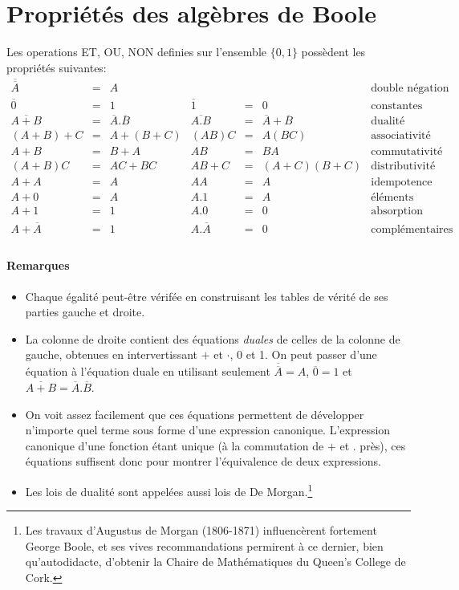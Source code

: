 \section{Propri\'et\'es des alg\`ebres de Boole}

Les operations ET, OU, NON definies sur l'ensemble $\{0,1\}$ poss\`edent les 
propri\'et\'es suivantes:
{\small
$$\begin{array}{rclrcll}
 \overline{\overline{A}} &=& A& &&	& \mbox{double n\'egation} \\
\overline{0} &=& 1	& \overline{1}	&=& 0	& \mbox{constantes} \\
\overline{A+B} &=& \overline{A}.\overline{B}	&
\overline{A.B}	&=& \overline{A}+\overline{B}	& 
\mbox{dualit\'e} \\
(A+B)+C &=& A+(B+C)	&
(AB)C	&=& A(BC)	& \mbox{associativit\'e} \\
A+B &=&	B+A & AB	&=& BA	& \mbox{commutativit\'e} \\
(A+B)C &=& AC+BC &
AB+C	&=& (A+C)(B+C)	& \mbox{distributivit\'e} \\
A+A &=&	A & AA	&=& A	& \mbox{idempotence} \\
A+0 &=&	A & A.1 &=& A	& \mbox{\'el\'ements neutres} \\
A+1 &=&	1 & A.0 &=& 0	& \mbox{absorption} \\
A+\overline{A} &=&	1 & A.\overline{A} &=& 0	
& \mbox{compl\'ementaires} \\
\end{array} $$
}
\paragraph{Remarques}
\begin{itemize}
\item Chaque \'egalit\'e peut-\^etre v\'erif\'ee en construisant 
les tables de v\'erit\'e de ses parties gauche et droite.  
\item La colonne de droite contient des \'equations {\em duales} de celles
de la colonne de gauche, obtenues en intervertissant $+$ et $\cdot$, 0 et 1.
On peut passer d'une \'equation \`a l'\'equation duale en utilisant seulement
$\overline{\overline{A}}=A$, $\overline{0}=1$ et 
$\overline{A+B}= \overline{A}.\overline{B}$.
\item On voit
assez facilement
que ces \'equations permettent de d\'evelopper n'importe quel terme sous forme
d'une expression canonique. L'expression canonique d'une fonction \'etant 
unique (\`a la commutation de $+$ et $.$ pr\`es), ces \'equations 
suffisent donc 
pour montrer l'\'equivalence de deux expressions.
\item Les lois de dualit\'e sont appel\'ees aussi lois de 
De Morgan.\footnote{Les travaux d'Augustus de Morgan (1806-1871)
influenc\`erent fortement George Boole, et ses vives recommandations 
permirent \`a ce dernier,
bien qu'autodidacte, d'obtenir
la Chaire de Math\'ematiques du Queen's College de Cork.}
\end{itemize}

